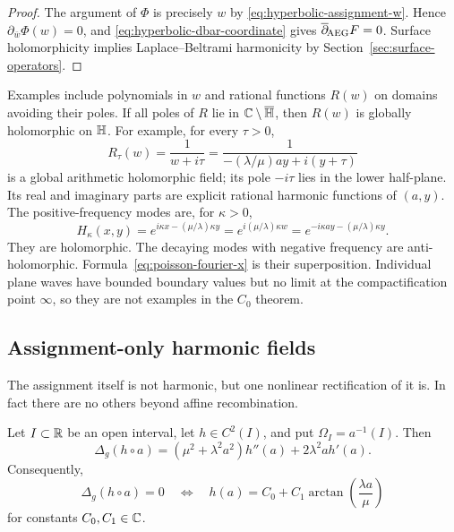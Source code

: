 \begin{proof}
The argument of $\Phi$ is precisely $w$ by
\eqref{eq:hyperbolic-assignment-w}.  Hence
$\partial_{\bar w}\Phi(w)=0$, and
\eqref{eq:hyperbolic-dbar-coordinate} gives $\overline\partial_{\!\mathrm{AEG}} F=0$.  Surface
holomorphicity implies Laplace--Beltrami harmonicity by
Section~\ref{sec:surface-operators}.
\end{proof}

Examples include polynomials in $w$ and rational functions $R(w)$ on domains
avoiding their poles.  If all poles of $R$ lie in
$\mathbb{C}\setminus\overline{\mathbb{H}}$, then $R(w)$ is globally holomorphic on $\mathbb{H}$.
For example, for every $\tau>0$,
\begin{equation}\label{eq:explicit-rational-assignment-family}
 R_\tau(w)=\frac1{w+i\tau}
 =\frac1{-(\lambda/\mu)ay+i(y+\tau)}
\end{equation}
is a global arithmetic holomorphic field; its pole $-i\tau$ lies in the lower
half-plane.  Its real and imaginary parts are explicit rational harmonic
functions of $(a,y)$.
The positive-frequency modes are, for $\kappa>0$,
\begin{equation}\label{eq:positive-holomorphic-mode}
 H_\kappa(x,y)
 =e^{i\kappa x-(\mu/\lambda)\kappa y}
 =e^{i(\mu/\lambda)\kappa w}
 =e^{-i\kappa ay-(\mu/\lambda)\kappa y}.
\end{equation}
They are holomorphic.  The decaying modes with negative frequency are
anti-holomorphic.  Formula~\eqref{eq:poisson-fourier-x} is their
superposition.  Individual plane waves have bounded boundary values but no
limit at the compactification point $\infty$, so they are not examples in the
$C_0$ theorem.

\subsection{Assignment-only harmonic fields}

The assignment itself is not harmonic, but one nonlinear rectification of it
is.  In fact there are no others beyond affine recombination.

\begin{theorem}
\label{thm:a-only-harmonic-classification}
Let $I\subset\mathbb{R}$ be an open interval, let $h\in C^2(I)$, and put
$\Omega_I=a^{-1}(I)$.  Then
\begin{equation}\label{eq:a-only-laplacian}
 \Delta_g(h\circ a)
 =(\mu^2+\lambda^2a^2)h''(a)
  +2\lambda^2a h'(a).
\end{equation}
Consequently,
\begin{equation}\label{eq:a-only-harmonic-family}
 \Delta_g(h\circ a)=0
 \quad\Longleftrightarrow\quad
 h(a)=C_0+C_1\arctan\!\left(\frac{\lambda a}{\mu}\right)
\end{equation}
for constants $C_0,C_1\in\mathbb{C}$.
\end{theorem}

